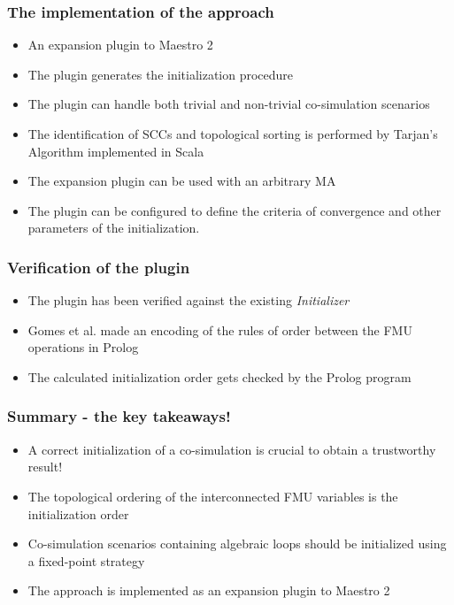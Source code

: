\documentclass{beamer}
\begin{document}
\begin{frame}
\frametitle{The implementation of the approach}
\begin{itemize}
    \item An expansion plugin to Maestro 2
    \item The plugin generates the initialization procedure
    \item The plugin can handle both trivial and non-trivial co-simulation scenarios
    \item The identification of SCCs and topological sorting is performed by Tarjan's Algorithm implemented in Scala
    \item The expansion plugin can be used with an arbitrary MA
    \item The plugin can be configured to define the criteria of convergence and other parameters of the initialization.
\end{itemize}
\end{frame}



\begin{frame}
\frametitle{Verification of the plugin}
\begin{itemize}
    \item The plugin has been verified against the existing \textit{Initializer}
    \item Gomes et al. made an encoding of the rules of order between the FMU operations in Prolog
    \item The calculated initialization order gets checked by the Prolog program
\end{itemize}
\end{frame}


\begin{frame}
\frametitle{Summary - the key takeaways!}
\begin{itemize}
    \item A correct initialization of a co-simulation is crucial to obtain a trustworthy result!
    \item The topological ordering of the interconnected FMU variables is the initialization order
    \item Co-simulation scenarios containing algebraic loops should be initialized using a fixed-point strategy
    \item The approach is implemented as an expansion plugin to Maestro 2  
\end{itemize}
\end{frame}
\end{document}
